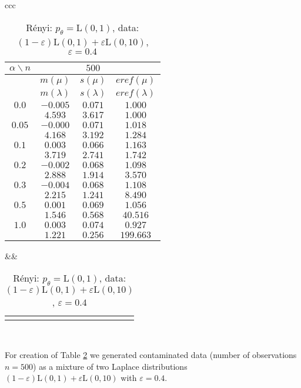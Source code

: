 {\begin{table}[htb] \footnotesize
\begin{center}
\begin{tabular}{ccc}
	\begin{tabular}{|c|ccc|} 
	\hline 
	$\alpha\backslash n$ &&  $500$ & \\ 
	\hline 
	& $m(\mu)$ & $s(\mu)$ & $eref(\mu)$ \\ 
	& $m(\lambda)$ & $s(\lambda)$ & $eref(\lambda)$ \\ 
	\hline 
	$0.0$ & $ -0.005 $ & $ 0.071 $ & $ 1.000 $\\ 
	 & $ 4.593 $ & $ 3.617 $ & $ 1.000 $\\ 
	\hline 
	$0.05$ & $ -0.000 $ & $ 0.071 $ & $ 1.018 $\\ 
	 & $ 4.168 $ & $ 3.192 $ & $ 1.284 $\\ 
	\hline 
	$0.1$ & $ 0.003 $ & $ 0.066 $ & $ 1.163 $\\ 
	 & $ 3.719 $ & $ 2.741 $ & $ 1.742 $\\ 
	\hline 
	$0.2$ & $ -0.002 $ & $ 0.068 $ & $ 1.098 $\\ 
	 & $ 2.888 $ & $ 1.914 $ & $ 3.570 $\\ 
	\hline 
	$0.3$ & $ -0.004 $ & $ 0.068 $ & $ 1.108 $\\ 
	 & $ 2.215 $ & $ 1.241 $ & $ 8.490 $\\ 
	\hline 
	$0.5$ & $ 0.001 $ & $ 0.069 $ & $ 1.056 $\\ 
	 & $ 1.546 $ & $ 0.568 $ & $ 40.516 $\\ 
	\hline 
	$1.0$ & $ 0.003 $ & $ 0.074 $ & $ 0.927 $\\ 
	 & $ 1.221 $ & $ 0.256 $ & $ 199.663 $\\ 
	\hline 
	\end{tabular}
&&
	\begin{tabular}{c}
		\epsfig{file=Laplace-e04-eref.eps, height=2in} 
	\end{tabular}
\\
\end{tabular}
\end{center}
\caption{R\'{e}nyi: $p_\theta = \mathrm{L}(0,1)$, data: $(1-\varepsilon)\mathrm{L}(0,1) + \varepsilon \mathrm{L}(0,10)$, $\varepsilon =  0.4$} 
\label{tabJK:laplace-eref}
\end{table}
For creation of Table \ref{tabJK:laplace-eref} we generated contaminated data (number of observations $n = 500$) as a mixture of two Laplace distributions $(1-\varepsilon)\mathrm{L}(0,1) + \varepsilon \mathrm{L}(0,10)$ with $\varepsilon =  0.4$. 
}
